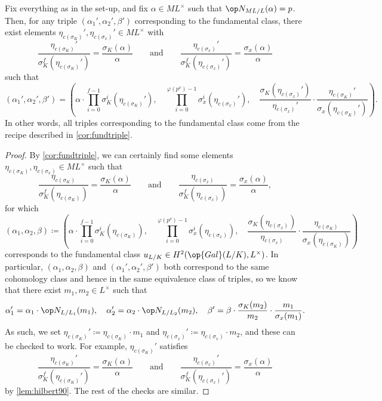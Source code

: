 \begin{cor} \label{cor:fullclass}
	Fix everything as in the set-up, and fix $\alpha\in ML^\times$ such that $\op N_{ML/L}(\alpha)=p$. Then, for any triple $(\alpha_1',\alpha_2',\beta')$ corresponding to the fundamental class, there exist elements $\eta_{c(\sigma_K)}',\eta_{c(\sigma_x)}'\in ML^\times$ with
	\[\frac{\eta_{c(\sigma_K)}'}{\sigma_K^f\left(\eta_{c(\sigma_K)}'\right)}=\frac{\sigma_K(\alpha)}{\alpha}\qquad\text{and}\qquad\frac{\eta_{c(\sigma_x)}'}{\sigma_K^f\left(\eta_{c(\sigma_x)}'\right)}=\frac{\sigma_x(\alpha)}{\alpha}\]
	such that
	\[(\alpha_1',\alpha_2',\beta')=\left(\alpha\cdot\prod_{i=0}^{f-1}\sigma_K^i\left(\eta_{c(\sigma_K)}'\right),\quad\prod_{i=0}^{\varphi\left(p^\nu\right)-1}\sigma_x^i\left(\eta_{c(\sigma_x)}'\right),\quad\frac{\sigma_K\left(\eta_{c(\sigma_x)}'\right)}{\eta_{c(\sigma_x)}'}\cdot\frac{\eta_{c(\sigma_K)}'}{\sigma_x\left(\eta_{c(\sigma_K)}'\right)}\right).\]
	In other words, all triples corresponding to the fundamental class come from the recipe described in \autoref{cor:fundtriple}.
\end{cor}
\begin{proof}
	By \autoref{cor:fundtriple}, we can certainly find some elements $\eta_{c(\sigma_K)},\eta_{c(\sigma_x)}\in ML^\times$ such that
	\[\frac{\eta_{c(\sigma_K)}}{\sigma_K^f\left(\eta_{c(\sigma_K)}\right)}=\frac{\sigma_K(\alpha)}{\alpha}\qquad\text{and}\qquad\frac{\eta_{c(\sigma_x)}}{\sigma_K^f\left(\eta_{c(\sigma_x)}\right)}=\frac{\sigma_x(\alpha)}{\alpha},\]
	for which
	\[(\alpha_1,\alpha_2,\beta)\coloneqq\left(\alpha\cdot\prod_{i=0}^{f-1}\sigma_K^i\left(\eta_{c(\sigma_K)}\right),\quad\prod_{i=0}^{\varphi\left(p^\nu\right)-1}\sigma_x^i\left(\eta_{c(\sigma_x)}\right),\quad\frac{\sigma_K\left(\eta_{c(\sigma_x)}\right)}{\eta_{c(\sigma_x)}}\cdot\frac{\eta_{c(\sigma_K)}}{\sigma_x\left(\eta_{c(\sigma_K)}\right)}\right)\]
	corresponds to the fundamental class $u_{L/K}\in H^2(\op{Gal}(L/K),L^\times)$. In particular, $(\alpha_1,\alpha_2,\beta)$ and $(\alpha_1',\alpha_2',\beta')$ both correspond to the same cohomology class and hence in the same equivalence class of triples, so we know that there exist $m_1,m_2\in L^\times$ such that
	\[\alpha_1'=\alpha_1\cdot\op N_{L/L_1}(m_1),\quad\alpha_2'=\alpha_2\cdot\op N_{L/L_2}(m_2),\quad\beta'=\beta\cdot\frac{\sigma_K(m_2)}{m_2}\cdot\frac{m_1}{\sigma_x(m_1)}.\]
	As such, we set $\eta_{c(\sigma_K)}'\coloneqq \eta_{c(\sigma_K)}\cdot m_1$ and $\eta_{c(\sigma_x)}'\coloneqq \eta_{c(\sigma_x)}\cdot m_2$, and these can be checked to work. For example, $\eta_{c(\sigma_K)}'$ satisfies
	\[\frac{\eta_{c(\sigma_K)}'}{\sigma_K^f\left(\eta_{c(\sigma_K)}'\right)}=\frac{\sigma_K(\alpha)}{\alpha}\qquad\text{and}\qquad\frac{\eta_{c(\sigma_x)}'}{\sigma_K^f\left(\eta_{c(\sigma_x)}'\right)}=\frac{\sigma_x(\alpha)}{\alpha}\]
	by \autoref{lem:hilbert90}. The rest of the checks are similar.
\end{proof}
